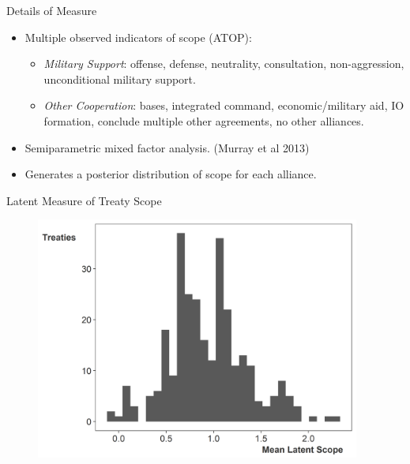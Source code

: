 \documentclass{beamer}
\begin{document}
\begin{frame}{Details of Measure}
 
\begin{itemize}
\item Multiple observed indicators of scope (ATOP): 
\begin{itemize} 
\item \textit{Military Support}: offense, defense, neutrality, consultation, non-aggression, unconditional military support.
\item \textit{Other Cooperation}: bases, integrated command, economic/military aid, IO formation, conclude multiple other agreements, no other alliances. 
\end{itemize} 
\pause 
\item Semiparametric mixed factor analysis. (Murray et al 2013)
\pause
\item Generates a posterior distribution of scope for each alliance.
\end{itemize} 


\end{frame} 


\begin{frame}{Latent Measure of Treaty Scope}

\begin{figure}[htbp]
	\centering
		\includegraphics[width=0.95\textwidth]{ls-hist.png}
\end{figure}


\end{frame} 
\end{document}
